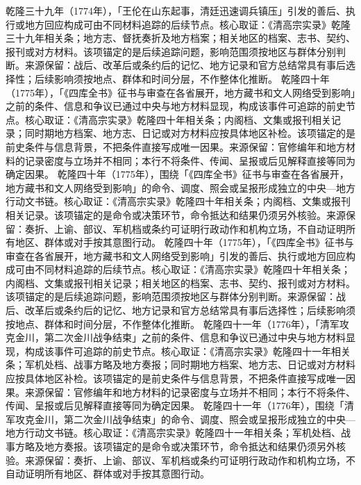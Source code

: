 乾隆三十九年（1774年），「王伦在山东起事，清廷迅速调兵镇压」引发的善后、执行或地方回应构成可由不同材料追踪的后续节点。核心取证：《清高宗实录》乾隆三十九年相关条；地方志、督抚奏折及地方档案；相关地区的档案、志书、契约、报刊或对方材料。该项锚定的是后续追踪问题，影响范围须按地区与群体分别判断。来源保留：战后、改革后或条约后的记忆、地方记录和官方总结常具有事后选择性；后续影响须按地点、群体和时间分层，不作整体化推断。
乾隆四十年（1775年），「《四库全书》征书与审查在各省展开，地方藏书和文人网络受到影响」之前的条件、信息和争议已通过中央与地方材料显现，构成该事件可追踪的前史节点。核心取证：《清高宗实录》乾隆四十年相关条；内阁档、文集或报刊相关记录；同时期地方档案、地方志、日记或对方材料应按具体地区补检。该项锚定的是前史条件与信息背景，不把条件直接写成唯一因果。来源保留：官修编年和地方材料的记录密度与立场并不相同；本行不将条件、传闻、呈报或后见解释直接等同为确定因果。
乾隆四十年（1775年），围绕「《四库全书》征书与审查在各省展开，地方藏书和文人网络受到影响」的命令、调度、照会或呈报形成独立的中央—地方行动文书链。核心取证：《清高宗实录》乾隆四十年相关条；内阁档、文集或报刊相关记录。该项锚定的是命令或决策环节，命令抵达和结果仍须另外核验。来源保留：奏折、上谕、部议、军机档或条约可证明行政动作和机构立场，不自动证明所有地区、群体或对手按其意图行动。
乾隆四十年（1775年），「《四库全书》征书与审查在各省展开，地方藏书和文人网络受到影响」引发的善后、执行或地方回应构成可由不同材料追踪的后续节点。核心取证：《清高宗实录》乾隆四十年相关条；内阁档、文集或报刊相关记录；相关地区的档案、志书、契约、报刊或对方材料。该项锚定的是后续追踪问题，影响范围须按地区与群体分别判断。来源保留：战后、改革后或条约后的记忆、地方记录和官方总结常具有事后选择性；后续影响须按地点、群体和时间分层，不作整体化推断。
乾隆四十一年（1776年），「清军攻克金川，第二次金川战争结束」之前的条件、信息和争议已通过中央与地方材料显现，构成该事件可追踪的前史节点。核心取证：《清高宗实录》乾隆四十一年相关条；军机处档、战事方略及地方奏报；同时期地方档案、地方志、日记或对方材料应按具体地区补检。该项锚定的是前史条件与信息背景，不把条件直接写成唯一因果。来源保留：官修编年和地方材料的记录密度与立场并不相同；本行不将条件、传闻、呈报或后见解释直接等同为确定因果。
乾隆四十一年（1776年），围绕「清军攻克金川，第二次金川战争结束」的命令、调度、照会或呈报形成独立的中央—地方行动文书链。核心取证：《清高宗实录》乾隆四十一年相关条；军机处档、战事方略及地方奏报。该项锚定的是命令或决策环节，命令抵达和结果仍须另外核验。来源保留：奏折、上谕、部议、军机档或条约可证明行政动作和机构立场，不自动证明所有地区、群体或对手按其意图行动。
